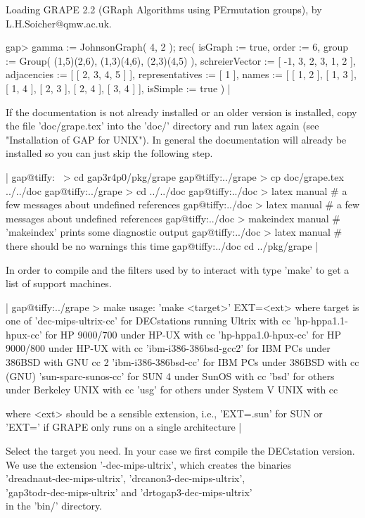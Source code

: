     Loading  GRAPE 2.2  (GRaph Algorithms using PErmutation groups),
    by L.H.Soicher@qmw.ac.uk.

    gap> gamma := JohnsonGraph( 4, 2 );
    rec(
      isGraph := true,
      order := 6,
      group := Group( (1,5)(2,6), (1,3)(4,6), (2,3)(4,5) ),
      schreierVector := [ -1, 3, 2, 3, 1, 2 ],
      adjacencies := [ [ 2, 3, 4, 5 ] ],
      representatives := [ 1 ],
      names := [ [ 1, 2 ], [ 1, 3 ], [ 1, 4 ], [ 2, 3 ], [ 2, 4 ],
          [ 3, 4 ] ],
      isSimple := true ) |

If the   documentation is not already   installed or an older  version is
installed, copy the  file  'doc/grape.tex' into the 'doc/'  directory and
run  latex again (see "Installation of   GAP for UNIX").   In general the
documentation   will already be   installed  so you    can just skip  the
following  step.  

|    gap@tiffy:~ > cd gap3r4p0/pkg/grape
    gap@tiffy:../grape > cp doc/grape.tex ../../doc
    gap@tiffy:../grape > cd ../../doc
    gap@tiffy:../doc > latex manual
    # a few messages about undefined references
    gap@tiffy:../doc > latex manual
    # a few messages about undefined references
    gap@tiffy:../doc > makeindex manual
    # 'makeindex' prints some diagnostic output
    gap@tiffy:../doc > latex manual
    # there should be no warnings this time
    gap@tiffy:../doc cd ../pkg/grape |

In order to compile {\nauty} and the filters used by {\GRAPE} to interact
with {\nauty} type 'make' to get a list of support machines.

|    gap@tiffy:../grape > make
    usage: 'make <target>' EXT=<ext> where target is one of
    'dec-mips-ultrix-cc'   for DECstations running Ultrix with cc
    'hp-hppa1.1-hpux-cc'   for HP 9000/700 under HP-UX with cc
    'hp-hppa1.0-hpux-cc'   for HP 9000/800 under HP-UX with cc
    'ibm-i386-386bsd-gcc2' for IBM PCs under 386BSD with GNU cc 2
    'ibm-i386-386bsd-cc'   for IBM PCs under 386BSD with cc (GNU)
    'sun-sparc-sunos-cc'   for SUN 4 under SunOS with cc
    'bsd'                  for others under Berkeley UNIX with cc
    'usg'                  for others under System V UNIX with cc

    where <ext> should be a sensible extension, i.e.,
    'EXT=.sun' for SUN or 'EXT=' if GRAPE only runs
    on a single architecture |

Select the target you need.  In your case we first compile the DECstation
version.   We use  the  extension '-dec-mips-ultrix',  which creates  the
binaries \\
'dreadnaut-dec-mips-ultrix', 'drcanon3-dec-mips-ultrix', \\
'gap3todr-dec-mips-ultrix' and 'drtogap3-dec-mips-ultrix' \\
in the 'bin/' directory.

